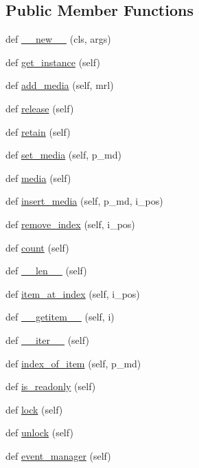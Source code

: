 \subsection*{Public Member Functions}
\begin{DoxyCompactItemize}
\item 
def \hyperlink{classvlc_1_1_media_list_acc2aa3fac6a63e8bac4f19efc327102b}{\+\_\+\+\_\+new\+\_\+\+\_\+} (cls, args)
\item 
def \hyperlink{classvlc_1_1_media_list_a56c15bafa43c856366863fc07fc4021f}{get\+\_\+instance} (self)
\item 
def \hyperlink{classvlc_1_1_media_list_a31bc69656e1be53564c74dc277f13ce1}{add\+\_\+media} (self, mrl)
\item 
def \hyperlink{classvlc_1_1_media_list_a4cd51e19135e5ad4a19eae3ea9c60537}{release} (self)
\item 
def \hyperlink{classvlc_1_1_media_list_a6394d82a0b79f0f91bb059d20ab43490}{retain} (self)
\item 
def \hyperlink{classvlc_1_1_media_list_a8d4d4151676c2941cdd0cee4e25648c5}{set\+\_\+media} (self, p\+\_\+md)
\item 
def \hyperlink{classvlc_1_1_media_list_a393e14f0f4e676ad1af0f76b61842d0e}{media} (self)
\item 
def \hyperlink{classvlc_1_1_media_list_aa87d8a88365b1fa73a9c947a264aec7b}{insert\+\_\+media} (self, p\+\_\+md, i\+\_\+pos)
\item 
def \hyperlink{classvlc_1_1_media_list_a44a92e05fc0eb945272ce4cf075779c5}{remove\+\_\+index} (self, i\+\_\+pos)
\item 
def \hyperlink{classvlc_1_1_media_list_a5eb880efb244834d39c062297388252b}{count} (self)
\item 
def \hyperlink{classvlc_1_1_media_list_a810fdc262754b6d21f5acd0e280d4daf}{\+\_\+\+\_\+len\+\_\+\+\_\+} (self)
\item 
def \hyperlink{classvlc_1_1_media_list_aea2e5bdf573ff28024234a9fd746edfc}{item\+\_\+at\+\_\+index} (self, i\+\_\+pos)
\item 
def \hyperlink{classvlc_1_1_media_list_af2c6b7930c773edecd6d320e4c263421}{\+\_\+\+\_\+getitem\+\_\+\+\_\+} (self, i)
\item 
def \hyperlink{classvlc_1_1_media_list_a45163c19b7c87f553c6f1d055d4668cb}{\+\_\+\+\_\+iter\+\_\+\+\_\+} (self)
\item 
def \hyperlink{classvlc_1_1_media_list_ac1a99349b013539c8620478519a72f81}{index\+\_\+of\+\_\+item} (self, p\+\_\+md)
\item 
def \hyperlink{classvlc_1_1_media_list_a3e80b240ea117697171e9abfa72b095d}{is\+\_\+readonly} (self)
\item 
def \hyperlink{classvlc_1_1_media_list_a8f6a887961a10aa3cbfe3ebed8e644ef}{lock} (self)
\item 
def \hyperlink{classvlc_1_1_media_list_a3aa5c7a8b194766605bd44948ae9588c}{unlock} (self)
\item 
def \hyperlink{classvlc_1_1_media_list_ab7c92812cd259eb8e4e4fd292b81bfaa}{event\+\_\+manager} (self)
\end{DoxyCompactItemize}
